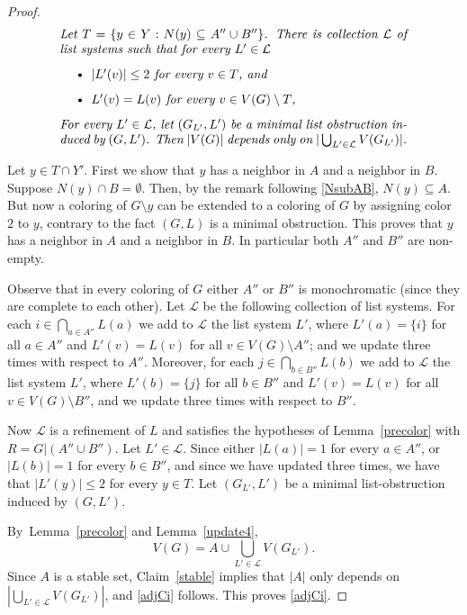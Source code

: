 \documentclass[11pt]{article}
\begin{document}
\begin{proof}
\begin{equation}\label{adjCi}
\begin{minipage}[c]{0.8\textwidth}\em
Let $T=\{y \in Y : N(y) \subseteq A'' \cup B''\}$. 
There is collection $\mathcal{L}$ of list systems such that for every
$L' \in \mathcal{L}$
\begin{itemize}  
\item  $|L'(v)| \leq 2$ for every $v \in T$, and
\item $L'(v)=L(v)$ for every $v \in V(G) \setminus T$, 
\end{itemize}
For every $L' \in \mathcal{L}$, let $(G_{L'},L')$ be a minimal list
obstruction induced by $(G,L')$.
Then $|V(G)|$  depends only on $|\bigcup_{L' \in \mathcal{L}}V(G_{L'})|$.

\end{minipage}
\end{equation}

Let $y \in T \cap Y'$. 
First we show that $y$ has a neighbor in $A$ and a neighbor in $B$.
Suppose $N(y) \cap B=\emptyset$. 
Then, by the remark following  \eqref{NsubAB}, $N(y) \subseteq A$. 
But now a coloring of $G \setminus y$ can be extended to a coloring of $G$ by assigning color $2$ to $y$, contrary to the fact $(G,L)$ is a minimal obstruction.
This proves that $y$ has a neighbor in $A$ and a neighbor in $B$.
In particular both $A''$ and $B''$  are non-empty.  

Observe that in every coloring of $G$
either $A''$ or $B''$ is monochromatic (since they are complete to each other).
Let $\mathcal{L}$  be the following collection of list systems.
For each $i \in \bigcap_{a \in A''}L(a)$ we add to $\mathcal L$  the list system $L'$, where $L'(a)=\{i\}$ for all $a \in A''$ and $L'(v)=L(v)$ for all $v \in V(G) \setminus A''$; and we update three times with respect to $A''$.
Moreover, for each $j \in \bigcap_{b \in B''}L(b)$ we add  to $\mathcal L$ the list system $L'$, where $L'(b)=\{j\}$ for all $b \in B''$ and $L'(v)=L(v)$ for all $v \in V(G) \setminus B''$, and we update three times with respect to $B''$.

Now $\mathcal L$ is a refinement of $L$ and satisfies the hypotheses of Lemma~\ref{precolor} with $R=G|(A'' \cup B'')$.
Let $L' \in \mathcal{L}$. Since either
$|L(a)|=1$ for every $a \in A''$, or $|L(b)|=1$ for every $b \in B''$, and
since we have updated three times, we have that
$|L'(y)| \leq 2$ for every $y \in T$.
Let $(G_{L'},L')$ be a minimal list-obstruction induced by $(G,L')$.

By~Lemma~\ref{precolor} and Lemma~\ref{update4},
$$V(G)=A \cup \bigcup_{L' \in \mathcal{L}} V(G_{L'}).$$
Since $A$ is a stable set, Claim~\ref{stable} implies that $|A|$ only depends on
$|\bigcup_{L' \in \mathcal{L}} V(G_{L'})|$, and \eqref{adjCi} follows.
This proves \eqref{adjCi}.


\end{proof}
\end{document}
